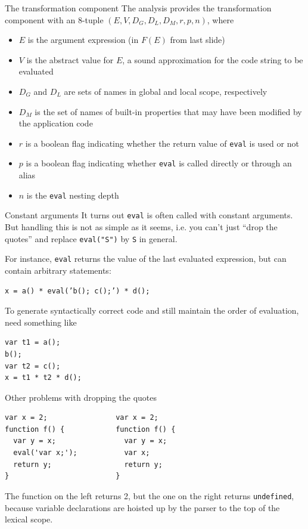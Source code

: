 \documentclass{beamer}
\begin{document}
\begin{frame}{The transformation component}
The analysis provides the transformation component with an 8-tuple
$(E, V, D_G, D_L, D_M, r, p, n)$, where
\begin{itemize}
\item $E$ is the argument expression (in $F(E)$ from last slide)
\item $V$ is the abstract value for $E$, a sound approximation for the
code string to be evaluated
\item $D_G$ and $D_L$ are sets of names in global and local scope,
respectively
\item $D_M$ is the set of names of built-in properties that may have been
modified by the application code
\item $r$ is a boolean flag indicating whether the return value of
{\tt eval} is used or not
\item $p$ is a boolean flag indicating whether {\tt eval} is called
directly or through an alias
\item $n$ is the {\tt eval} nesting depth
\end{itemize}
\end{frame}

\begin{frame}[fragile]{Constant arguments}
It turns out {\tt eval} is often called with constant arguments. But
handling this is not as simple as it seems, i.e. you can't just 
``drop the quotes'' and replace {\tt eval("S")} by {\tt S} in general.
\vspace{5mm}

For instance, {\tt eval} returns the value of the last evaluated expression,
but can contain arbitrary statements: \vspace{3mm}

{\tt x = a() * eval('b(); c();') * d();}
\vspace{3mm}

To generate syntactically correct code and still maintain the order of
evaluation, need something like

\begin{verbatim}
var t1 = a();
b();
var t2 = c();
x = t1 * t2 * d();
\end{verbatim}
\end{frame}
\begin{frame}[fragile]{Other problems with dropping the quotes}
\begin{verbatim}
var x = 2;                var x = 2;
function f() {            function f() {
  var y = x;                var y = x;
  eval('var x;');           var x;
  return y;                 return y;
}                         }
\end{verbatim}
The function on the left returns 2, but the one on the right returns
{\tt undefined}, because variable declarations are hoisted up by the parser
to the top of the lexical scope.
\end{frame}
\end{document}
